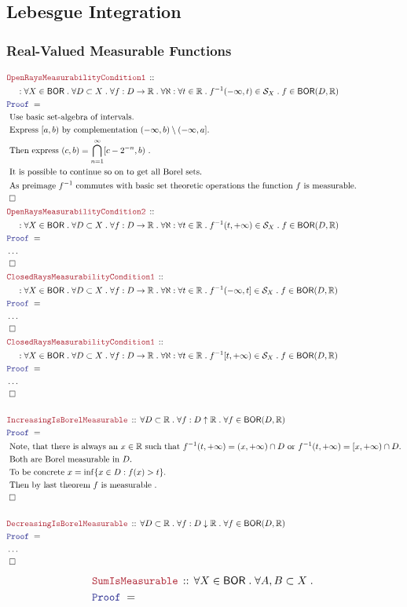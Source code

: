 \documentclass[12pt]{scrartcl}
\newcommand{\LOGIC}[1]{\textcolor{Blue}{\mathtt{#1}}}
\newcommand{\THM}[1]{\textcolor{Maroon}{\mathtt{#1}}}
\renewcommand{\.}{\; . \;}
\newcommand{\Theorem}[2]{& \THM{#1} \, :: \, #2 \\ & \Proof = \\ }
\newcommand{\NewLine}{\\ & \kern 1pc}
\newcommand{\Page}[1]{ \begin{align*} #1 \end{align*}   }
\newcommand{\NoProof}{ & \ldots \\ \EndProof}
\newcommand{\Reals}{\mathbb{R} }
\newcommand{\QED}{\; \square}
\newcommand{\EndProof}{& \QED \\}
\newcommand{\Proof}{\LOGIC{Proof} \; }
\newcommand{\Explain}[1]{& \text{#1.} \\}
\newcommand{\BOR}{\mathsf{BOR}}
\renewcommand{\S}{\mathcal{S}}
\begin{document}
\subsection{Lebesgue Integration}
\subsubsection{Real-Valued Measurable Functions}
\Page{
	\Theorem{OpenRaysMeasurabilityCondition1}
	{
		\NewLine :		
		\forall X \in \BOR \. 
		\forall D \subset X \.
		\forall f : D \to \Reals \. 
		\forall \aleph : \forall t \in \Reals \. f^{-1}(-\infty, t) \in \S_X \. 
		f \in \BOR(D,\Reals)
	}
	\Explain{ Use basic set-algebra of intervals}
	\Explain{ Express $[a,b)$ by complementation $(-\infty,b)\setminus (-\infty,a]$}
	\Explain{ Then express $(c,b) = \bigcap^\infty_{n=1}[c-2^{-n},b)$ }
	\Explain{ It is possible to continue so on to get all Borel sets}
	\Explain{ As preimage $f^{-1}$ commutes with basic set theoretic operations the function
	$f$ is measurable}
	\EndProof
	\Theorem{OpenRaysMeasurabilityCondition2}
	{
		\NewLine:		
		\forall X \in \BOR \. 
		\forall D \subset X \.
		\forall f : D \to \Reals \. 
		\forall \aleph : \forall t \in \Reals \. f^{-1}(t, + \infty) \in \S_X \. 
		f \in \BOR(D,\Reals)
	}
	\NoProof
	\Theorem{ClosedRaysMeasurabilityCondition1}
	{
		\NewLine :		
		\forall X \in \BOR \. 
		\forall D \subset X \.
		\forall f : D \to \Reals \. 
		\forall \aleph : \forall t \in \Reals \. f^{-1}(-\infty, t] \in \S_X \. 
		f \in \BOR(D,\Reals)
	}
	\NoProof
	\Theorem{ClosedRaysMeasurabilityCondition1}
	{
		\NewLine : 		
		\forall X \in \BOR \. 
		\forall D \subset X \.
		\forall f : D \to \Reals \. 
		\forall \aleph : \forall t \in \Reals \. f^{-1}[t, + \infty) \in \S_X \. 
		f \in \BOR(D,\Reals)
	}
	\NoProof
	\\
	\Theorem{IncreasingIsBorelMeasurable}
	{
		\forall D \subset \Reals \.
		\forall f : D \uparrow \Reals \.
		\forall f \in \BOR(D,\Reals)
	}
	\Explain{ Note, that there is always an $x\in \Reals$ such that $f^{-1}(t,+\infty)= (x,+\infty) \cap D$
	or $f^{-1}(t,+\infty)= [x,+\infty) \cap D$}
	\Explain{
		Both are Borel measurable in $D$}
	\Explain{
		To be concrete 
		$x = \inf \{ x \in D : f(x) > t   \}$}
	\Explain{
		Then by last theorem $f$ is measurable
	}
	\EndProof
	\\
	\Theorem{DecreasingIsBorelMeasurable}
	{
		\forall D \subset \Reals \.
		\forall f : D \downarrow \Reals \.
		\forall f \in \BOR(D,\Reals)
	}
	\NoProof
}\Page{
	\Theorem{SumIsMeasurable}
	{
		\forall X \in \BOR \.
		\forall A,B \subset X \.
}}
\end{document}
